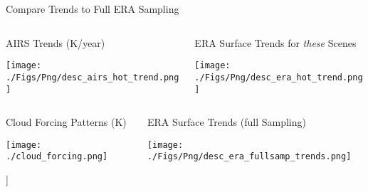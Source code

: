 \documentclass[10pt,t]{beamer}
\begin{document}
\begin{frame}[label={sec:orgbdbf733}]{Compare Trends to Full ERA Sampling}
\vspace{-0.35in}
\begin{columns}
\begin{column}{0.55\columnwidth}
\begin{block}{\scriptsize AIRS Trends (K/year)}
\vspace{-0.1in}
\begin{center}
\texttt{[image: ./Figs/Png/desc\_airs\_hot\_trend.png]}
\end{center}
\end{block}
\end{column}

\begin{column}{0.55\columnwidth}
\begin{block}{\scriptsize ERA Surface Trends for \emph{these} Scenes}
\vspace{-0.1in}
\begin{center}
\texttt{[image: ./Figs/Png/desc\_era\_hot\_trend.png]}
\end{center}
\end{block}
\end{column}
\end{columns}



\begin{columns}
\begin{column}{0.55\columnwidth}
\begin{block}{\scriptsize Cloud Forcing Patterns (K)}
\vspace{-0.1in}
\begin{center}
\texttt{[image: ./cloud\_forcing.png]}
\end{center}]
\end{block}
\end{column}



\begin{column}{0.55\columnwidth}
\begin{block}{\scriptsize ERA Surface Trends (full Sampling)}
\vspace{-0.1in}
\begin{center}
\texttt{[image: ./Figs/Png/desc\_era\_fullsamp\_trends.png]}
\end{center}
\end{block}
\end{column}
\end{columns}
\end{frame}
\end{document}
